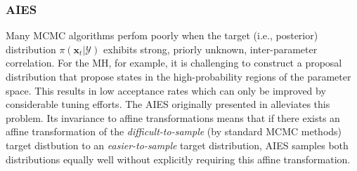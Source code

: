 \subsubsection{\acrfull{AIES}}
Many \acrshort{MCMC} algorithms perfom poorly when the target (i.e., posterior) distribution $\pi(\boldsymbol{x}_{t}|\mathcal{Y})$ exhibits strong, priorly unknown, inter-parameter correlation. For the \acrshort{MH}, for example, it is challenging to construct a proposal distribution that propose states in the high-probability regions of the parameter space. This results in low acceptance rates which can only be improved by considerable tuning efforts. The \acrshort{AIES} originally presented in \cite{goodman2010} alleviates this problem. Its invariance to affine transformations means that if there exists an affine transformation of the \textit{difficult-to-sample} (by standard \acrshort{MCMC} methods) target distbution to an \textit{easier-to-sample} target distribution, \acrshort{AIES} samples both distributions equally well without explicitly requiring this affine transformation.

